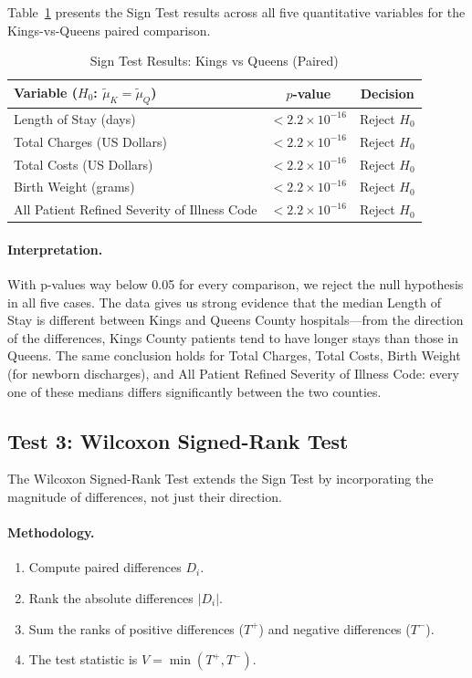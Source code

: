 \documentclass[12pt]{article}
\begin{document}
Table~\ref{tab:sign-all} presents the Sign Test results across all
five quantitative variables for the Kings-vs-Queens paired comparison.

\begin{table}[H]
\centering
\caption{Sign Test Results: Kings vs Queens (Paired)}
\label{tab:sign-all}
\begin{tabular}{lcc}
\toprule
\textbf{Variable ($H_0$: $\tilde{\mu}_K = \tilde{\mu}_Q$)} & \textbf{$p$-value} & \textbf{Decision} \\
\midrule
Length of Stay (days)           & $< 2.2 \times 10^{-16}$ & Reject $H_0$ \\
Total Charges (US Dollars)             & $< 2.2 \times 10^{-16}$ & Reject $H_0$ \\
Total Costs (US Dollars)               & $< 2.2 \times 10^{-16}$ & Reject $H_0$ \\
Birth Weight (grams)            & $< 2.2 \times 10^{-16}$ & Reject $H_0$ \\
All Patient Refined Severity of Illness Code    & $< 2.2 \times 10^{-16}$ & Reject $H_0$ \\
\bottomrule
\end{tabular}
\end{table}

\paragraph{Interpretation.}
With p-values way below 0.05 for every comparison, we reject the null
hypothesis in all five cases. The data gives us strong evidence that
the median Length of Stay is different between Kings and Queens County
hospitals---from the direction of the differences, Kings County
patients tend to have longer stays than those in Queens. The same
conclusion holds for Total Charges, Total Costs, Birth Weight (for
newborn discharges), and All Patient Refined Severity of Illness Code: every one of
these medians differs significantly between the two counties.

\subsection{Test 3: Wilcoxon Signed-Rank Test}

The Wilcoxon Signed-Rank Test extends the Sign Test by incorporating the
magnitude of differences, not just their direction.

\paragraph{Methodology.}
\begin{enumerate}[nosep]
    \item Compute paired differences $D_i$.
    \item Rank the absolute differences $|D_i|$.
    \item Sum the ranks of positive differences ($T^+$) and negative differences ($T^-$).
    \item The test statistic is $V = \min(T^+, T^-)$.
\end{enumerate}
\end{document}
